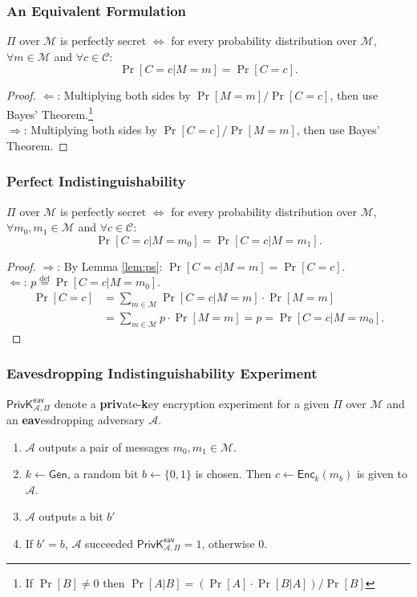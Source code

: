 \begin{frame}\frametitle{An Equivalent Formulation}
\begin{lemma} \label{lem:ps} 
$\Pi$ over $\mathcal{M}$ is perfectly secret $\iff$ for every probability distribution over $\mathcal{M}$, $\forall m \in \mathcal{M}$ and $\forall c \in \mathcal{C}$:
\[ \Pr[C=c | M=m] = \Pr[C=c].\]
\end{lemma}
\begin{proof}
$\Leftarrow$: Multiplying both sides by $\Pr[M=m]/\Pr[C=c]$, then use Bayes' Theorem.\footnote{If $\Pr[B]\neq 0$ then $ \Pr[A|B] = \left( \Pr[A] \cdot \Pr[B|A] \right) / \Pr[B] $} \\
$\Rightarrow$: Multiplying both sides by $\Pr[C=c]/\Pr[M=m]$, then use Bayes' Theorem.
\end{proof}
\end{frame}
\begin{frame}\frametitle{Perfect Indistinguishability}
\begin{lemma}\label{lem:pi}
$\Pi$ over $\mathcal{M}$ is perfectly secret $\iff$ for every probability distribution over $\mathcal{M}$, $\forall m_0, m_1 \in \mathcal{M}$ and $\forall c \in \mathcal{C}$:
\[ \Pr[C=c | M=m_0] = \Pr[C=c | M=m_1].\]
\end{lemma}
\begin{proof}
$\Rightarrow$: By Lemma \ref{lem:ps}: $\Pr[C=c | M=m] = \Pr[C=c]$. \\
$\Leftarrow$: $p \overset{\text{def}}{=} \Pr[C=c | M=m_0]$.
\[
\begin{split}
	\Pr[C=c] &= \sum_{m \in \mathcal{M}} \Pr[C=c|M=m] \cdot \Pr[M=m] \\
	&= \sum_{m \in \mathcal{M}} p \cdot \Pr[M=m] = p = \Pr[C=c|M=m_0].
\end{split}
\]
\end{proof}
\end{frame}
\begin{frame}\frametitle{Eavesdropping Indistinguishability Experiment}
$\mathsf{PrivK}^{\mathsf{eav}}_{\mathcal{A},\Pi}$ denote a \textbf{priv}ate-\textbf{k}ey encryption experiment for a given $\Pi$ over $\mathcal{M}$ and an \textbf{eav}esdropping adversary $\mathcal{A}$.
\begin{enumerate}
	\item $\mathcal{A}$ outputs a pair of messages $m_0, m_1 \in \mathcal{M}$.
	\item $k \gets \mathsf{Gen}$, a random bit $b \gets \{0,1\}$ is chosen. Then $c \gets \mathsf{Enc}_k(m_b)$ is given to $\mathcal{A}$.
	\item $\mathcal{A}$ outputs a bit $b'$
	\item If $b' = b$, $\mathcal{A}$ succeeded $\mathsf{PrivK}^{\mathsf{eav}}_{\mathcal{A},\Pi}=1$, otherwise 0.
\end{enumerate}
\begin{figure}
\begin{center}

\end{center}
\end{figure}
\end{frame}
